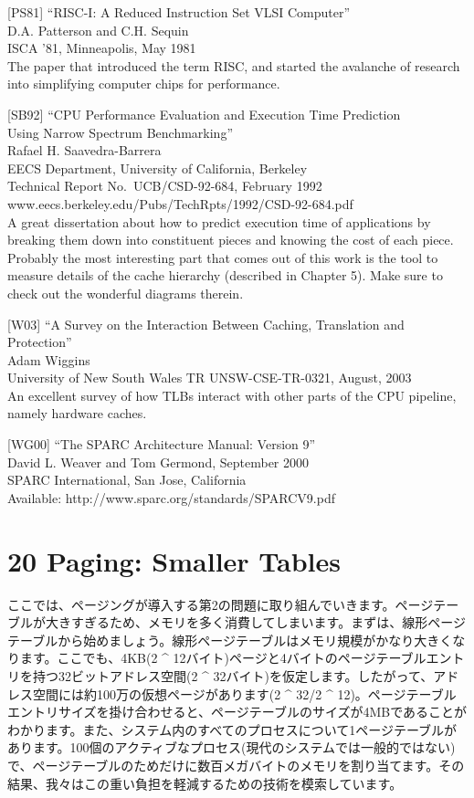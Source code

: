 {[}PS81{]} ``RISC-I: A Reduced Instruction Set VLSI Computer''\\
D.A. Patterson and C.H. Sequin\\
ISCA '81, Minneapolis, May 1981\\
The paper that introduced the term RISC, and started the avalanche of
research into simplifying computer chips for performance.

{[}SB92{]} ``CPU Performance Evaluation and Execution Time Prediction\\
Using Narrow Spectrum Benchmarking''\\
Rafael H. Saavedra-Barrera\\
EECS Department, University of California, Berkeley\\
Technical Report No.~UCB/CSD-92-684, February 1992\\
www.eecs.berkeley.edu/Pubs/TechRpts/1992/CSD-92-684.pdf\\
A great dissertation about how to predict execution time of applications
by breaking them down into constituent pieces and knowing the cost of
each piece. Probably the most interesting part that comes out of this
work is the tool to measure details of the cache hierarchy (described in
Chapter 5). Make sure to check out the wonderful diagrams therein.

{[}W03{]} ``A Survey on the Interaction Between Caching, Translation and
Protection''\\
Adam Wiggins\\
University of New South Wales TR UNSW-CSE-TR-0321, August, 2003\\
An excellent survey of how TLBs interact with other parts of the CPU
pipeline, namely hardware caches.

{[}WG00{]} ``The SPARC Architecture Manual: Version 9''\\
David L. Weaver and Tom Germond, September 2000\\
SPARC International, San Jose, California\\
Available: http://www.sparc.org/standards/SPARCV9.pdf

\newpage

\hypertarget{paging-smaller-tables}{%
\section*{20 Paging: Smaller Tables}\label{paging-smaller-tables}}

ここでは、ページングが導入する第2の問題に取り組んでいきます。ページテーブルが大きすぎるため、メモリを多く消費してしまいます。まずは、線形ページテーブルから始めましょう。線形ページテーブルはメモリ規模がかなり大きくなります。ここでも、4KB(2
\^{}
12バイト)ページと4バイトのページテーブルエントリを持つ32ビットアドレス空間(2
\^{}
32バイト)を仮定します。したがって、アドレス空間には約100万の仮想ページがあります(2
\^{} 32/2 \^{}
12)。ページテーブルエントリサイズを掛け合わせると、ページテーブルのサイズが4MBであることがわかります。また、システム内のすべてのプロセスについて1ページテーブルがあります。100個のアクティブなプロセス(現代のシステムでは一般的ではない)で、ページテーブルのためだけに数百メガバイトのメモリを割り当てます。その結果、我々はこの重い負担を軽減するための技術を模索しています。

